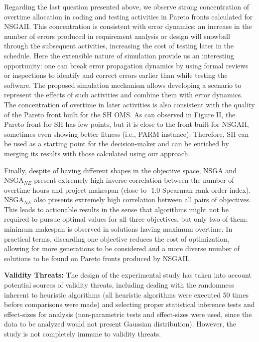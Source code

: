 \documentclass[conference]{IEEEtran}
\begin{document}
Regarding the last question presented above, we observe strong concentration of overtime allocation in coding and testing activities in Pareto fronts calculated for NSGAII. This concentration is consistent with error dynamics: an increase in the number of errors produced in requirement analysis or design will snowball through the subsequent activities, increasing the cost of testing later in the schedule. Here the extensible nature of simulation provide us an interesting opportunity: one can break error propagation dynamics by using formal reviews or inspections to identify and correct errors earlier than while testing the software. The proposed simulation mechanism allows developing a scenario to represent the effects of such activities \cite{Madachy:1996} and combine them with error dynamics. The concentration of overtime in later activities is also consistent with the quality of the Pareto front built for the SH OMS. As can observed in Figure II, the Pareto front for SH has few points, but it is close to the front built for NSGAII, sometimes even showing better fitness (i.e., PARM instance). Therefore, SH can be used as a starting point for the decision-maker and can be enriched by merging its results with those calculated using our approach.

Finally, despite of having different shapes in the objective space, NSGA and NSGA$_{NE}$ present extremely high inverse correlation between the number of overtime hours and project makespan (close to -1.0 Spearman rank-order index). NSGA$_{NE}$ also presents extremely high correlation between all pairs of objectives. This leads to actionable results in the sense that algorithms might not be required to pursue optimal values for all three objectives, but only two of them: minimum makespan is observed in solutions having maximum overtime. In practical terms, discarding one objective reduces the cost of optimization, allowing for more generations to be considered and a more diverse number of solutions to be found on Pareto fronts produced by NSGAII.

\vspace{3px}
\noindent
\textbf{Validity Threats:} The design of the experimental study has taken into account potential sources of validity threats, including dealing with the randomness inherent to heuristic algorithms (all heuristic algorithms were executed 50 times before comparisons were made) and selecting proper statistical inference tests and effect-sizes for analysis (non-parametric tests and effect-sizes were used, since the data to be analyzed would not present Gaussian distribution). However, the study is not completely immune to validity threats.
\end{document}
